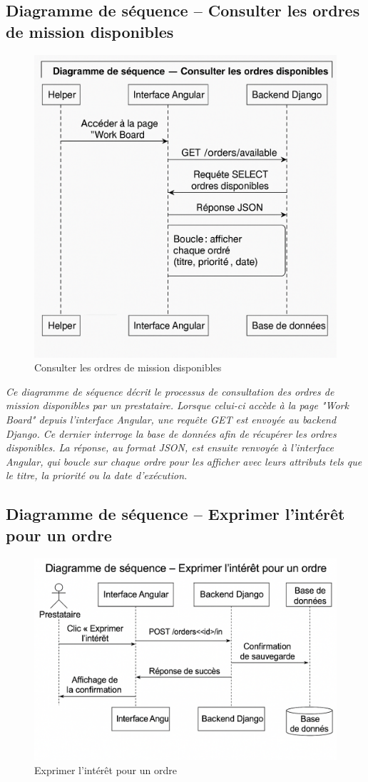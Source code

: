 \subsection*{Diagramme de séquence – Consulter les ordres de mission disponibles}
\begin{figure}[H]
\centering
\includegraphics[width=0.85\linewidth]{figures/Diagramme de sequence cons ordres .png}
\caption{Consulter les ordres de mission disponibles}
\end{figure}

\textit{Ce diagramme de séquence décrit le processus de consultation des ordres de mission disponibles par un prestataire. Lorsque celui-ci accède à la page "Work Board" depuis l'interface Angular, une requête GET est envoyée au backend Django. Ce dernier interroge la base de données afin de récupérer les ordres disponibles. La réponse, au format JSON, est ensuite renvoyée à l'interface Angular, qui boucle sur chaque ordre pour les afficher avec leurs attributs tels que le titre, la priorité ou la date d'exécution.}


\subsection*{Diagramme de séquence – Exprimer l'intérêt pour un ordre}
\begin{figure}[H]
\centering
\includegraphics[width=0.85\linewidth]{figures/exprimer d'interet seq.png}
\caption{Exprimer l'intérêt pour un ordre}
\end{figure}

